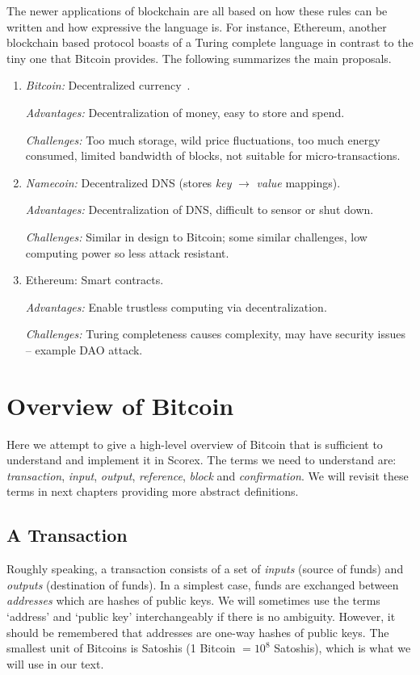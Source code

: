 \documentclass[]{report}   %
\begin{document}
{The newer applications of blockchain are all based on how these rules can be written and how expressive the language is. For instance, Ethereum, another blockchain based protocol boasts of a Turing complete language in contrast to the tiny one that Bitcoin provides. The following summarizes the main proposals.

%
\begin{enumerate}
	\item {\em Bitcoin:} Decentralized currency~\cite{Nakamoto2008,}.
	
		{\em Advantages:} Decentralization of money, easy to store and spend.
		
		{\em Challenges:} Too much storage, wild price fluctuations, too much energy consumed, limited bandwidth of blocks, not suitable for micro-transactions.
	\item {\em Namecoin:} Decentralized DNS (stores {\em key} $\rightarrow$ {\em value} mappings). 

		{\em Advantages:} Decentralization of DNS, difficult to sensor or shut down.
		
		{\em Challenges:} Similar in design to Bitcoin; some similar challenges, low computing power so less attack resistant.
	
	\item {Ethereum:} Smart	contracts.
	
	  {\em Advantages:} Enable trustless computing via decentralization.		
		
		{\em Challenges:} Turing completeness causes complexity, may have security issues -- example DAO attack.
	
\end{enumerate}
}

\chapter{Overview of Bitcoin}

Here we attempt to give a high-level overview of Bitcoin that is sufficient to understand and implement it in Scorex. The terms we need to understand are: {\em transaction}, {\em input}, {\em output}, {\em reference}, {\em block} and {\em confirmation}. We will revisit these terms in next chapters providing more abstract definitions.
 
\section{A Transaction} Roughly speaking, a transaction consists of a set of \emph{inputs} (source of funds) and \emph{outputs} (destination of funds).
In a simplest case, funds are exchanged between {\em addresses} which are hashes of public keys. We will sometimes use the terms `address' and `public key' interchangeably if there is no ambiguity. However, it should be remembered that addresses are one-way hashes of public keys. %
The smallest unit of Bitcoins is Satoshis (1 Bitcoin $=10^8$ Satoshis), which is what we will use in our text.
\end{document}
